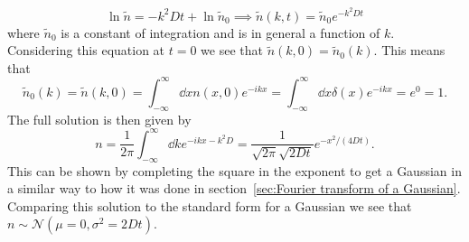 \documentclass[a4paper]{article}
\begin{document}
    \[\ln\tilde{n} = -k^2Dt + \ln\tilde{n}_0 \implies \tilde{n}(k, t) = \tilde{n}_0e^{-k^2Dt}\]
    where \(\tilde{n}_0\) is a constant of integration and is in general a function of \(k\).
    Considering this equation at \(t = 0\) we see that \(\tilde{n}(k, 0) = \tilde{n}_0(k)\).
    This means that
    \[\tilde{n}_0(k) = \tilde{n}(k, 0) = \int_{-\infty}^{\infty} \dd{x} n(x, 0)e^{-ikx} = \int_{-\infty}^{\infty} \dd{x} \delta(x)e^{-ikx} = e^0 = 1.\]
    The full solution is then given by
    \[n = \frac{1}{2\pi} \int_{-\infty}^{\infty} \dd{k} e^{-ikx - k^2D} = \frac{1}{\sqrt{2\pi}\sqrt{2Dt}}e^{-x^2/(4Dt)}.\]
    This can be shown by completing the square in the exponent to get a Gaussian in a similar way to how it was done in section~\ref{sec:Fourier transform of a Gaussian}.
    Comparing this solution to the standard form for a Gaussian we see that \(n\sim\mathcal{N}(\mu = 0, \sigma^2 = 2Dt)\).
    
\end{document}
